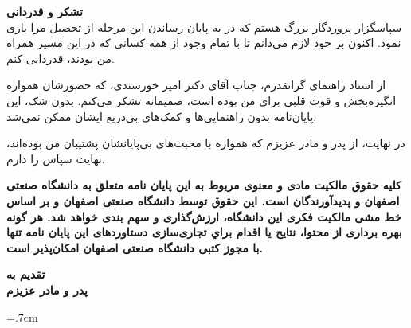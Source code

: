 \thispagestyle{empty}
\vspace*{1.5cm}

{\large
	\textbf{تشکر و قدردانی}\\

	سپاسگزار پروردگار بزرگ هستم که در به پایان رساندن این مرحله از تحصیل مرا یاری نمود. اکنون بر خود لازم می‌دانم تا با تمام وجود از همه کسانی که در این مسیر همراه من بودند، قدردانی کنم.  
	
	از استاد راهنمای گرانقدرم، جناب آقای دکتر امیر خورسندی، که حضورشان همواره انگیزه‌بخش و قوت قلبی برای من بوده است، صمیمانه تشکر می‌کنم. بدون شک، این پایان‌نامه بدون راهنمایی‌ها و کمک‌های بی‌دریغ ایشان ممکن نمی‌شد.
	
	در نهایت، از پدر و مادر عزیزم که همواره با محبت‌های بی‌پایانشان پشتیبان من بوده‌اند، نهایت سپاس را دارم.

}
\restoregeometry
\pagebreak

\thispagestyle{empty}

\begin{spacing}{3}
\leavevmode
\vfill
\parbox{8 cm}{

\textbf{\Large
	 کلیه حقوق مالکیت مادی و معنوی مربوط به اين پايان نامه متعلق به دانشگاه صنعتی اصفهان و پدیدآورندگان است. این حقوق توسط دانشگاه صنعتی اصفهان و بر اساس خط مشی مالکیت فکری این دانشگاه، ارزش‌گذاری و سهم بندی خواهد شد.
	 هر گونه بهره برداری از محتوا، نتايج یا اقدام براي تجاری‌سازی دستاوردهای اين پايان نامه تنها با مجوز کتبی دانشگاه صنعتی اصفهان امکان‌پذیر است.
	 }

}
\vfill
\end{spacing}
\restoregeometry
\pagebreak

\thispagestyle{empty}
\vspace*{4cm}

{\LARGE
\centering
\textbf{تقدیم به \\ پدر و مادر عزیزم }

}
\pagebreak


\baselineskip=.7cm

